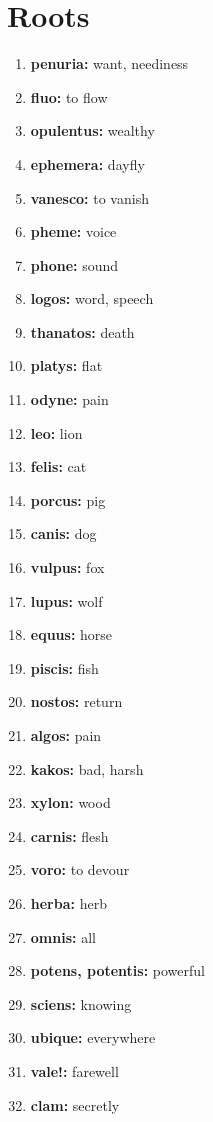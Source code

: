 \documentclass{article}
\begin{document}
\section{Roots}
\begin{enumerate}
    \item \textbf{penuria: }{want, neediness}
    \item \textbf{fluo: }{to flow}
    \item \textbf{opulentus: }{wealthy}
    \item \textbf{ephemera: }{dayfly}
    \item \textbf{vanesco: }{to vanish}
    \item \textbf{pheme: }{voice}
    \item \textbf{phone: }{sound}
    \item \textbf{logos: }{word, speech}
    \item \textbf{thanatos: }{death}
    \item \textbf{platys: }{flat}
    \item \textbf{odyne: }{pain}
    \item \textbf{leo: }{lion}
    \item \textbf{felis: }{cat}
    \item \textbf{porcus: }{pig}
    \item \textbf{canis: }{dog}
    \item \textbf{vulpus: }{fox}
    \item \textbf{lupus: }{wolf}
    \item \textbf{equus: }{horse}
    \item \textbf{piscis: }{fish}
    \item \textbf{nostos: }{return}
    \item \textbf{algos: }{pain}
    \item \textbf{kakos: }{bad, harsh}
    \item \textbf{xylon: }{wood}
    \item \textbf{carnis: }{flesh}
    \item \textbf{voro: }{to devour}
    \item \textbf{herba: }{herb}
    \item \textbf{omnis: }{all}
    \item \textbf{potens, potentis: }{powerful}
    \item \textbf{sciens: }{knowing}
    \item \textbf{ubique: }{everywhere}
    \item \textbf{vale!: }{farewell}
    \item \textbf{clam: }{secretly}
    
\end{enumerate}
\end{document}
